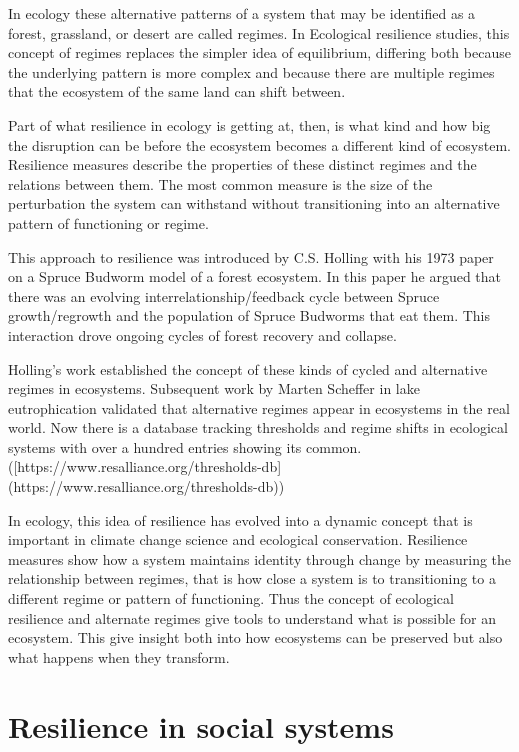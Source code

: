 In ecology these alternative patterns of a system that may be identified as a forest, grassland, or desert are called regimes. In Ecological resilience studies, this concept of regimes replaces the simpler idea of equilibrium, differing both because the underlying pattern is more complex and because there are multiple regimes that the ecosystem of the same land can shift between. 

Part of what resilience in ecology is getting at, then, is what kind and how big the disruption can be before the ecosystem becomes a different kind of ecosystem. Resilience measures describe the properties of these distinct regimes and the relations between them. The most common measure is the size of the perturbation the system can withstand without transitioning into an alternative pattern of functioning or regime.  

This approach to resilience was introduced by C.S. Holling with his 1973 paper on a Spruce Budworm model of a forest ecosystem. In this paper he argued that there was an evolving interrelationship/feedback cycle between Spruce growth/regrowth and the population of Spruce Budworms that eat them. This interaction drove ongoing cycles of forest recovery and collapse. 

Holling's work established the concept of these kinds of cycled and alternative regimes in ecosystems. Subsequent work by Marten Scheffer in lake eutrophication validated that alternative regimes appear in ecosystems in the real world. Now there is a database tracking thresholds and regime shifts in ecological systems with over a hundred entries showing its common.  ([https://www.resalliance.org/thresholds-db](https://www.resalliance.org/thresholds-db)) 

In ecology, this idea of resilience has evolved into a dynamic concept that is important in climate change science and ecological conservation. Resilience measures show how a system maintains identity through change by measuring the relationship between regimes, that is how close a system is to transitioning to a different regime or pattern of functioning. Thus the concept of ecological resilience and alternate regimes give tools to understand what is possible for an ecosystem. This give insight both into how ecosystems can be preserved but also what happens when they transform. 




\section{Resilience in social systems}

